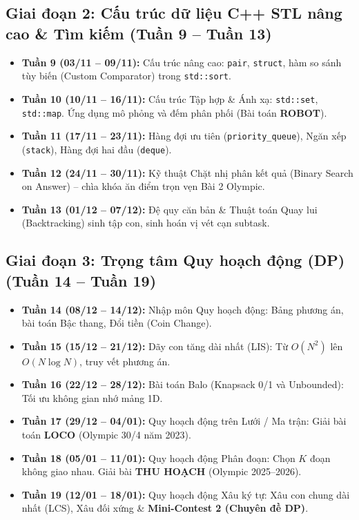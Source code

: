 \documentclass[11pt,a4paper]{article}
\begin{document}
\subsection*{\color{AsianBlue}Giai đoạn 2: Cấu trúc dữ liệu C++ STL nâng cao \& Tìm kiếm (Tuần 9 -- Tuần 13)}
\begin{itemize}
    \setlength{\itemsep}{1.5pt}
    \item \textbf{Tuần 9 (03/11 -- 09/11):} Cấu trúc nâng cao: \texttt{pair}, \texttt{struct}, hàm so sánh tùy biến (Custom Comparator) trong \texttt{std::sort}.
    \item \textbf{Tuần 10 (10/11 -- 16/11):} Cấu trúc Tập hợp \& Ánh xạ: \texttt{std::set}, \texttt{std::map}. Ứng dụng mô phỏng và đếm phân phối (Bài toán \textbf{ROBOT}).
    \item \textbf{Tuần 11 (17/11 -- 23/11):} Hàng đợi ưu tiên (\texttt{priority\_queue}), Ngăn xếp (\texttt{stack}), Hàng đợi hai đầu (\texttt{deque}).
    \item \textbf{Tuần 12 (24/11 -- 30/11):} Kỹ thuật Chặt nhị phân kết quả (Binary Search on Answer) -- chìa khóa ăn điểm trọn vẹn Bài 2 Olympic.
    \item \textbf{Tuần 13 (01/12 -- 07/12):} Đệ quy căn bản \& Thuật toán Quay lui (Backtracking) sinh tập con, sinh hoán vị vét cạn subtask.
\end{itemize}

\subsection*{\color{AsianBlue}Giai đoạn 3: Trọng tâm Quy hoạch động (DP) (Tuần 14 -- Tuần 19)}
\begin{itemize}
    \setlength{\itemsep}{1.5pt}
    \item \textbf{Tuần 14 (08/12 -- 14/12):} Nhập môn Quy hoạch động: Bảng phương án, bài toán Bậc thang, Đổi tiền (Coin Change).
    \item \textbf{Tuần 15 (15/12 -- 21/12):} Dãy con tăng dài nhất (LIS): Từ $O(N^2)$ lên $O(N \log N)$, truy vết phương án.
    \item \textbf{Tuần 16 (22/12 -- 28/12):} Bài toán Balo (Knapsack 0/1 và Unbounded): Tối ưu không gian nhớ mảng 1D.
    \item \textbf{Tuần 17 (29/12 -- 04/01):} Quy hoạch động trên Lưới / Ma trận: Giải bài toán \textbf{LOCO} (Olympic 30/4 năm 2023).
    \item \textbf{Tuần 18 (05/01 -- 11/01):} Quy hoạch động Phân đoạn: Chọn $K$ đoạn không giao nhau. Giải bài \textbf{THU HOẠCH} (Olympic 2025--2026).
    \item \textbf{Tuần 19 (12/01 -- 18/01):} Quy hoạch động Xâu ký tự: Xâu con chung dài nhất (LCS), Xâu đối xứng \& \textbf{Mini-Contest 2 (Chuyên đề DP)}.
\end{itemize}
\end{document}
